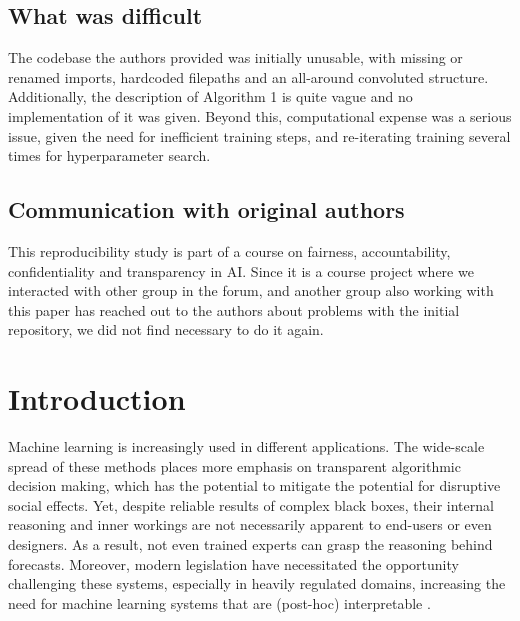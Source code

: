 
\subsection*{What was difficult}

The codebase the authors provided was initially unusable, with missing or renamed imports, hardcoded filepaths and an all-around convoluted structure. Additionally, the description of Algorithm 1 is quite vague and no implementation of it was given. Beyond this, computational expense was a serious issue, given the need for inefficient training steps, and re-iterating training several times for hyperparameter search.


\subsection*{Communication with original authors}
This reproducibility study is part of a course on fairness, accountability, confidentiality and transparency in AI. Since it is a course project where we interacted with other group in the forum, and another group also working with this paper has reached out to the authors about problems with the initial repository, we did not find necessary to do it again.

\section{Introduction}
Machine learning is increasingly used in different applications. The wide-scale spread of these methods places more emphasis on transparent algorithmic decision making, which has the potential  to mitigate the potential for disruptive social effects. Yet, despite reliable results of complex black boxes, their internal reasoning and inner workings are not necessarily apparent to end-users or even designers. As a result, not even trained experts can grasp the reasoning behind forecasts. Moreover, modern legislation have necessitated the opportunity challenging these systems, especially in heavily regulated domains, increasing the need for machine learning systems that are (post-hoc) interpretable \cite{carvalho2019machine}.\\

